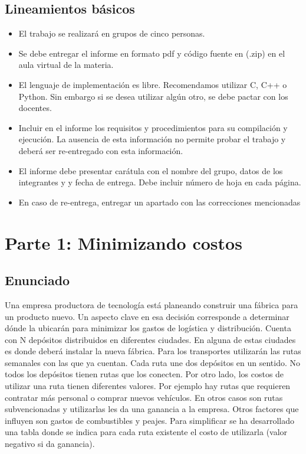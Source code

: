 \documentclass[titlepage,a4paper]{article}
\begin{document}
\subsection{Lineamientos básicos}
\begin{itemize}
    \item El trabajo se realizará en grupos de cinco personas.
    \item Se debe entregar el informe en formato pdf y código fuente en (.zip) en el aula virtual de la materia.
    \item El lenguaje de implementación es libre. Recomendamos utilizar C, C++ o Python. Sin embargo si se desea utilizar algún otro, se debe pactar con los docentes.
    \item Incluir en el informe los requisitos y procedimientos para su compilación y ejecución. La ausencia de esta información no permite probar el trabajo y deberá ser re-entregado con esta información.
    \item El informe debe presentar carátula con el nombre del grupo, datos de los integrantes y y fecha de entrega. Debe incluir número de hoja en cada página.
    \item En caso de re-entrega, entregar un apartado con las correcciones mencionadas
\end{itemize}

\setcounter{section}{0}%
\renewcommand{\thesection}{P\arabic{section}}%

\newpage\section{Parte 1: Minimizando costos}\label{sec:parte1}

\setcounter{subsection}{0}%
\renewcommand{\thesubsection}{\alph{subsection}}%

\subsection{Enunciado}

Una empresa productora de tecnología está planeando construir una fábrica para un
producto nuevo. Un aspecto clave en esa decisión corresponde a determinar dónde la
ubicarán para minimizar los gastos de logística y distribución. Cuenta con N depósitos
distribuidos en diferentes ciudades. En alguna de estas ciudades es donde deberá
instalar la nueva fábrica. Para los transportes utilizarán las rutas semanales con las
que ya cuentan. Cada ruta une dos depósitos en un sentido. No todos los depósitos
tienen rutas que los conecten. Por otro lado, los costos de utilizar una ruta tienen
diferentes valores. Por ejemplo hay rutas que requieren contratar más personal o
comprar nuevos vehículos. En otros casos son rutas subvencionadas y utilizarlas les
da una ganancia a la empresa. Otros factores que influyen son gastos de combustibles
y peajes. Para simplificar se ha desarrollado una tabla donde se indica para cada
ruta existente el costo de utilizarla (valor negativo si da ganancia).
\end{document}
